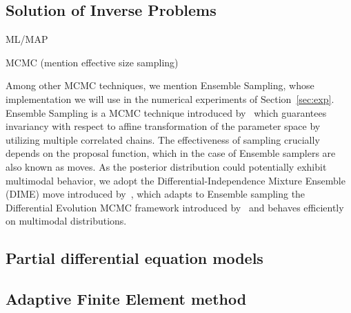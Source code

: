 \subsection{Solution of Inverse Problems}\label{sec:IP-sol}
ML/MAP\medskip

MCMC (mention effective size sampling)\medskip

Among other MCMC techniques, we mention Ensemble Sampling, whose implementation we will use in the numerical experiments of Section~\ref{sec:exp}.
Ensemble Sampling is a MCMC technique introduced by~\cite{GoodmanWeare} which guarantees invariancy with respect to affine transformation of the parameter space by utilizing multiple correlated chains. 
The effectiveness of sampling crucially depends on the proposal function, which in the case of Ensemble samplers are also known as moves.
As the posterior distribution could potentially exhibit multimodal behavior, we adopt the Differential-Independence Mixture Ensemble (DIME) move introduced by~\cite{Boehl}, which adapts to Ensemble sampling the Differential Evolution MCMC framework introduced by~\cite{TerBraak} and behaves efficiently on multimodal distributions. 

\subsection{Partial differential equation models} \label{sec:PDE}

\subsection{Adaptive Finite Element method} \label{sec:AdaFE}